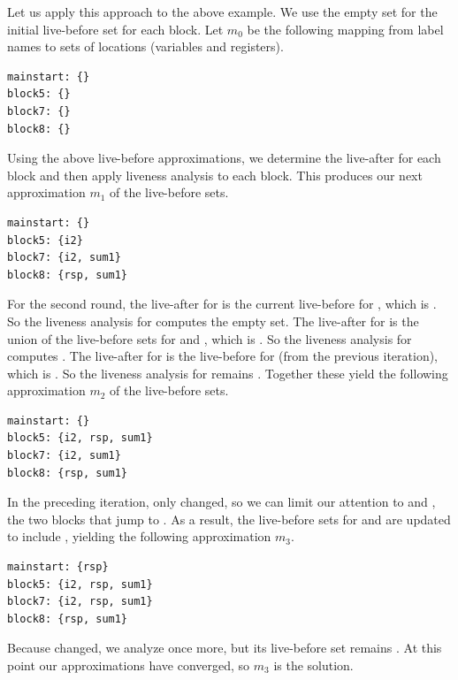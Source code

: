 \documentclass[11pt]{book}
\begin{document}
Let us apply this approach to the above example. We use the empty set
for the initial live-before set for each block. Let $m_0$ be the
following mapping from label names to sets of locations (variables and
registers).
\begin{center}
\begin{lstlisting}
mainstart: {}
block5: {}
block7: {}
block8: {}
\end{lstlisting}
\end{center}
Using the above live-before approximations, we determine the
live-after for each block and then apply liveness analysis to each
block.  This produces our next approximation $m_1$ of the live-before
sets.
\begin{center}
  \begin{lstlisting}
mainstart: {}
block5: {i2}
block7: {i2, sum1}
block8: {rsp, sum1}
\end{lstlisting}
\end{center}

For the second round, the live-after for  is the
current live-before for , which is .  So the
liveness analysis for  computes the empty set. The
live-after for  is the union of the live-before sets for
 and , which is .
So the liveness analysis for  computes .  The live-after for  is the live-before for
 (from the previous iteration), which is .
So the liveness analysis for  remains .  Together these yield the following approximation $m_2$ of
the live-before sets.
\begin{center}
  \begin{lstlisting}
mainstart: {}
block5: {i2, rsp, sum1}
block7: {i2, sum1}
block8: {rsp, sum1}
\end{lstlisting}
\end{center}
In the preceding iteration, only  changed, so we can
limit our attention to  and , the two
blocks that jump to .  As a result, the live-before sets
for  and  are updated to include
, yielding the following approximation $m_3$.
\begin{center}
  \begin{lstlisting}
mainstart: {rsp}
block5: {i2, rsp, sum1}
block7: {i2, rsp, sum1}
block8: {rsp, sum1}
\end{lstlisting}
\end{center}
Because  changed, we analyze  once more, but
its live-before set remains .  At this point
our approximations have converged, so $m_3$ is the solution.
\end{document}

